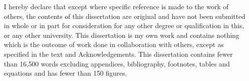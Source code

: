 
\begin{declaration}

I hereby declare that except where specific reference is made to the work of others, the contents of this dissertation are original and have not been submitted in whole or in part for consideration for any other degree or qualification in this, or any other university. This dissertation is my own work and contains nothing which is the outcome of work done in collaboration with others, except as specified in the text and Acknowledgements. This dissertation contains fewer than 16,500 words excluding appendices, bibliography, footnotes, tables and equations and has fewer than 150 figures.


\end{declaration}

